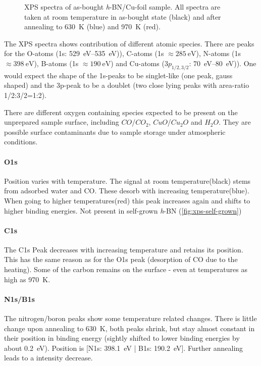 \begin{figure}[!h]
{	}
	\caption{XPS spectra of as-bought \textit{h}-BN/Cu-foil sample\cite{_graphene_2014}. All spectra are taken at room temperature in as-bought state (black) and after annealing to \SI{630}{\K} (blue) and \SI{970}{\K} (red).}
	\label{fig:xps-bought}
\end{figure}

%

The XPS spectra shows contribution of different atomic species. There are peaks for the O-atoms (1s: \SIrange{529}{535}{\eV})), C-atoms (1s $\approx \SI{285}{\eV}$), N-atoms (1s $\approx \SI{398}{\eV}$), B-atoms (1s $\approx \SI{190}{\eV}$) and Cu-atoms ($3p_{1/2,3/2}$: \SIrange{70}{80}{\eV})). One would expect the shape of the 1s-peaks to be singlet-like (one peak, gauss shaped) and the 3p-peak to be a doublet (two close lying peaks with area-ratio 1/2:3/2=1:2).

There are different oxygen containing species expected to be present on the unprepared sample surface, including $CO$/$CO_2$, $CuO$/$Cu_2O$ and $H_2O$. They are possible surface contaminants due to sample storage under atmospheric conditions.
\paragraph{O1s}
Position varies with temperature. The signal at room temperature(black) stems from adsorbed water and CO. These desorb with increasing temperature(blue). When going to higher temperatures(red) this peak increases again and shifts to higher binding energies. Not present in self-grown \textit{h}-BN (\autoref{fig:xps-self-grown})

\paragraph{C1s}
The C1s Peak decreases with increasing temperature and retains its position. This has the same  reason as for the O1s peak (desorption of CO due to the heating). Some of the carbon remains on the surface - even at temperatures as high as \SI{970}{\K}.

\paragraph{N1s/B1s}
The nitrogen/boron peaks show some temperature related changes. There is little change upon annealing to \SI{630}{\K}, both peaks shrink, but stay almost constant in their position in binding energy (sightly shifted to lower binding energies by about \SI{0.2}{\eV}). Position is [N1s: \SI{398.1}{\eV} | B1s: \SI{190.2}{\eV}]. Further annealing leads to a intensity decrease.

